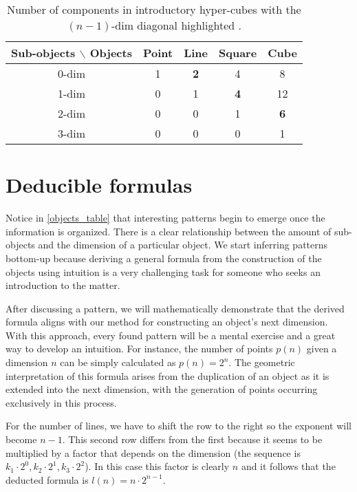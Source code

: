 \documentclass{article}
\begin{document}
	\begin{table}[ht]
		\centering
		\caption{Number of components in introductory hyper-cubes with the $(n-1)$-dim diagonal highlighted \cite{coxeter1973regular}.}
		\begin{tabular}{||c | c c c c||}
			\hline
			Sub-objects $\backslash$ Objects & Point & Line & Square & Cube\\\hline\hline
			0-dim & 1 & \textbf{2} & 4 & 8\\\hline
			1-dim & 0 & 1 & \textbf{4} & 12\\\hline
			2-dim & 0 & 0 & 1 & \textbf{6}\\\hline
			3-dim & 0 & 0 & 0 & 1\\\hline
		\end{tabular}
		\label{objects_table}
	\end{table}
	
	\section{Deducible formulas \label{sec:deducible}}
	
	Notice in \autoref{objects_table} that interesting patterns begin to emerge once the information is organized. There is a clear relationship between the amount of sub-objects and the dimension of a particular object. We start inferring patterns bottom-up because deriving a general formula from the construction of the objects using intuition is a very challenging task for someone who seeks an introduction to the matter.
	
	After discussing a pattern, we will mathematically demonstrate that the derived formula aligns with our method for constructing an object's next dimension. With this approach, every found pattern will be a mental exercise and a great way to develop an intuition. For instance, the number of points $p(n)$ given a dimension $n$ can be simply calculated as $p(n) = 2^{n}$. The geometric interpretation of this formula arises from the duplication of an object as it is extended into the next dimension, with the generation of points occurring exclusively in this process.
	
	For the number of lines, we have to shift the row to the right so the exponent will become $n-1$. This second row differs from the first because it seems to be multiplied by a factor that depends on the dimension (the sequence is $k_1 \cdot 2^{0}, k_2 \cdot 2^{1}, k_3 \cdot 2^{2}$). In this case this factor is clearly $n$ and it follows that the deducted formula is $l(n) = n \cdot 2^{n-1}$.
	
\end{document}
